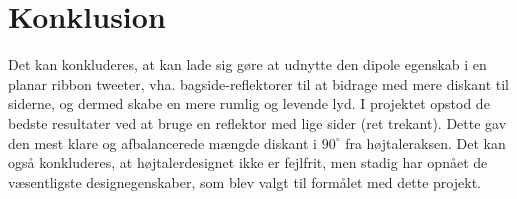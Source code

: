 \section{Konklusion}
Det kan konkluderes, at kan lade sig gøre at udnytte den dipole egenskab i en planar ribbon tweeter, vha. bagside-reflektorer til at bidrage med mere diskant til siderne, og dermed skabe en mere rumlig og levende lyd.
I projektet opstod de bedste resultater ved at bruge en reflektor med lige sider (ret trekant). 
Dette gav den mest klare og afbalancerede mængde diskant i $90 ^{\circ}$ fra højtaleraksen.
Det kan også konkluderes, at højtalerdesignet ikke er fejlfrit, men stadig har opnået de væsentligste designegenskaber, som blev valgt til formålet med dette projekt. 
